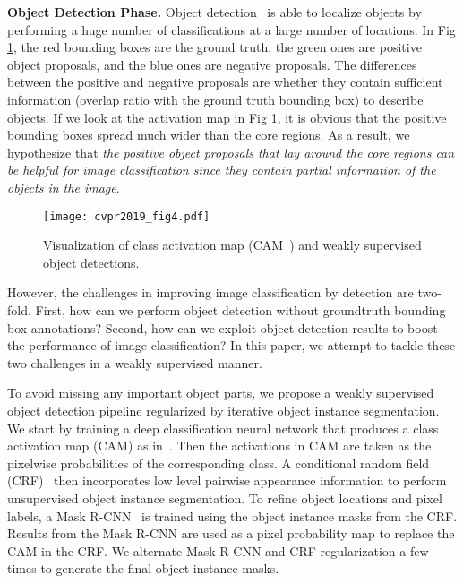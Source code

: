 \documentclass[10pt,twocolumn,letterpaper]{article}
\begin{document}
\noindent\textbf{Object Detection Phase.} Object detection~\cite{felzenszwalb2008discriminatively, girshick2014rich,he2017mask} is able to localize objects by performing a huge number of classifications at a large number of locations. In Fig \ref{Fig:Visualization}, the red bounding boxes are the ground truth, the green ones are positive object proposals, and the blue ones are negative proposals. The differences between the positive and negative proposals are whether they contain sufficient information (overlap ratio with the ground truth bounding box) to describe objects. If we look at the activation map in Fig \ref{Fig:Visualization}, it is obvious that the positive bounding boxes spread much wider than the core regions. As a result, we hypothesize that { \em the positive object proposals that lay around the core regions can be helpful for image classification since they contain partial information of the objects in the image}.
\begin{figure}[ht]
  \centering
  \texttt{[image: cvpr2019\_fig4.pdf]}
  \caption{Visualization of class activation map (CAM~\cite{zhou2016learning}) and weakly supervised object detections.}
  \label{Fig:Visualization}
\end{figure}
However, the challenges in improving image classification by detection are two-fold. First, how can we perform object detection without groundtruth bounding box annotations? Second, how can we exploit object detection results to boost the performance of image classification? In this paper, we attempt to tackle these two challenges in a weakly supervised manner.

To avoid missing any important object parts, we propose a weakly supervised object detection pipeline regularized by iterative object instance segmentation. We start by training a deep classification neural network that produces a class activation map (CAM) as in~\cite{zhou2016learning}. Then the activations in CAM are taken as the pixelwise probabilities of the corresponding class. A conditional random field (CRF)~\cite{sutton2012introduction} then incorporates low level pairwise appearance information to perform unsupervised object instance segmentation. To refine object locations and pixel labels, a Mask R-CNN~\cite{he2017mask} is trained using the object instance masks from the CRF. Results from the Mask R-CNN are used as a pixel probability map to replace the CAM in the CRF. We alternate Mask R-CNN and CRF regularization a few times to generate the final object instance masks.
\end{document}
